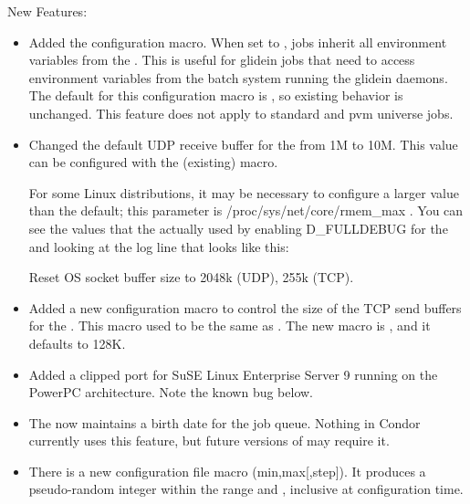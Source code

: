 \noindent New Features:

\begin{itemize}

\item Added the configuration
macro.  When set
to , jobs inherit all environment variables from
the .  This is useful for glidein jobs that need to access
environment variables from the batch system running the glidein daemons.
The default for this configuration macro is , so existing behavior
is unchanged.  This feature does not apply to standard and pvm universe
jobs.

\item Changed the default UDP receive buffer for the
 from 1M to 10M.  This value can be configured with
the (existing)  macro.

\Note For some Linux distributions, it may be necessary to configure
a larger value than the default; this parameter is
/proc/sys/net/core/rmem\_max .  You can see the values that the
 actually used by enabling D\_FULLDEBUG for the
 and looking at the log line that looks like this:

Reset OS socket buffer size to 2048k (UDP), 255k (TCP).

\item Added a new configuration macro to control the size of the
TCP send buffers for the .  This macro used to
be the same as .  The new macro is
, and it defaults to 128K.

\item Added a clipped port for SuSE Linux Enterprise Server 9 running on the 
PowerPC architecture.  Note the known bug below.

\item The  now maintains a birth date for the job queue. 
Nothing in Condor currently uses this feature, but future versions of  may require it. 

\item There is a new configuration file macro
(min,max[,step]).  It produces a
pseudo-random integer within the range \verb@min@ and \verb@max@,
inclusive at configuration time.

\end{itemize}

